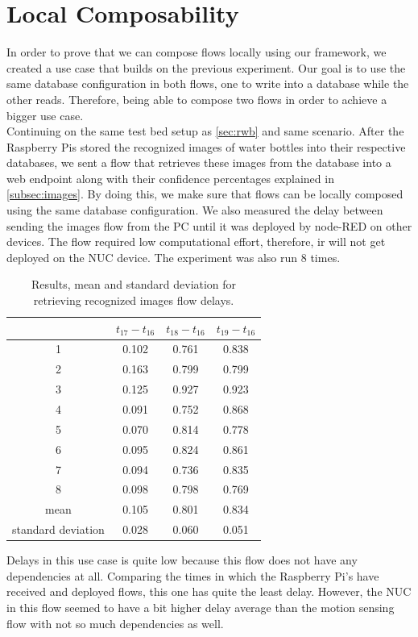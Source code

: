 \section{Local Composability}
In order to prove that we can compose flows locally using our framework, we created a use case that builds on the  previous experiment. Our goal is to use the same database configuration in both flows, one to write into a database while the other reads. Therefore, being able to compose two flows in order to achieve a bigger use case.\\

 \noindent Continuing on the same test bed setup as \ref{sec:rwb} and same scenario.  After the Raspberry Pis stored the recognized images of water bottles into their respective  databases, we sent a flow that retrieves these images from the database into a web endpoint along with their confidence percentages explained in \ref{subsec:images}. By doing this, we make sure that flows can be locally composed using the same database configuration. We also measured the delay between sending the images flow from the PC until it was deployed by node-RED on other devices. The flow required low computational effort, therefore, ir will not get deployed on the NUC device. The experiment was also run 8 times.

\begin{table}[H]
\centering
\begin{tabular}{ c | c | c| c }	\toprule
&$t_{17} - t_{16}$  & $t_{18} - t_{16}$  & $t_{19}-t_{16}$ \\ \midrule
1&	0.102&	0.761&	0.838\\
2&	0.163&	0.799&	0.799\\
3&	0.125&	0.927&	0.923\\
4&	0.091&	0.752&	0.868\\
5&	0.070&	0.814&	0.778\\
6&	0.095&	0.824&	0.861\\
7& 0.094&	0.736&	0.835\\
8&	0.098&	0.798&	0.769\\	
mean&	0.105&	0.801&	0.834\\
standard deviation&	0.028&	0.060&	0.051\\
\end{tabular}
\caption{Results, mean and standard deviation for retrieving recognized images flow delays.}
\label{table:images}
\end{table}

\noindent Delays in this use case is quite low because this flow does not have any dependencies at all. Comparing the times in which the Raspberry Pi's have received and deployed flows, this one  has quite the least delay. However, the NUC in this flow seemed to have a bit higher delay average than the motion sensing flow with not so much dependencies as well.


